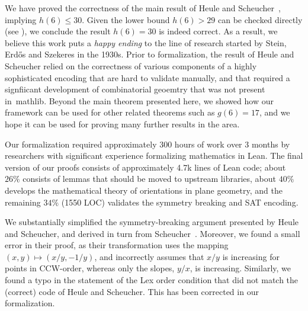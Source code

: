We have proved the correctness of the main result of Heule and Scheucher~\cite{emptyHexagonNumber}, implying $h(6) \leq 30$. Given the lower bound $h(6) > 29$ can be checked directly (see \cite{emptyHexagonNumber}), we conclude the result $h(6) = 30$ is indeed correct.
As a result, we believe this work puts a \emph{happy ending} to the line of research started by Stein, Erd\H{o}s and Szekeres in the 1930s. Prior to formalization, the result of Heule and Scheucher relied on the correctness of various components of a highly sophisticated encoding that are hard to validate manually, and that required a signfiicant development of combinatorial geoemtry that was not present in~\textsf{mathlib}.
Beyond the main theorem presented here,
we showed how our framework can be used for other related theorems such as $g(6) = 17$, and we hope it can be used for proving many further results in the area.


Our formalization required approximately 300 hours of work over 3 months
by researchers with significant experience formalizing mathematics in Lean.
The final version of our proofs consists of approximately 4.7k lines of Lean code;
about $26\%$ consists of lemmas that should be moved to upstream libraries,
about $40\%$ develops the mathematical theory of orientations in plane geometry,
and the remaining $34\%$ (1550 LOC) validates the symmetry breaking and SAT encoding.

We substantially simplified the symmetry-breaking argument presented by Heule and Scheucher, and derived in turn from Scheucher~\cite{scheucherTwoDisjoint5holes2020}.
Moreover, we found a small error in their proof, as their transformation uses the mapping $(x, y) \mapsto (x/y, -1/y)$, and incorrectly assumes that $x/y$ is increasing for points in CCW-order, whereas only the slopes, $y/x$, is increasing.
Similarly, we found a typo in the statement of the \textsf{Lex order} condition that did not match the (correct) code of Heule and Scheucher. This has been corrected in our formalization.



